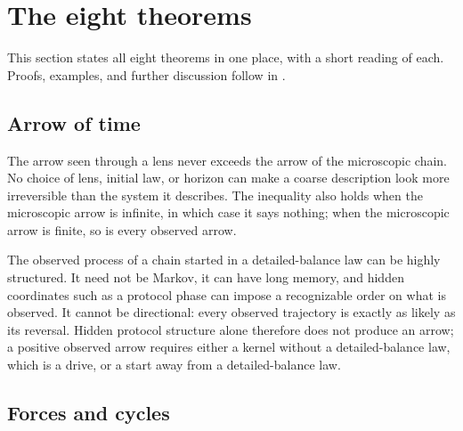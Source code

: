 \section{The eight theorems}\label{sec:main-results}

This section states all eight theorems in one place, with a short reading of each.
Proofs, examples, and further discussion follow in .

\subsection*{Arrow of time}

\begin{theorem}\label{thm:NG_ARROW_DPI}
\ThmStmtNGARROWDPI
\end{theorem}

The arrow seen through a lens never exceeds the arrow of the microscopic chain.
No choice of lens, initial law, or horizon can make a coarse description look more irreversible than the system it describes.
The inequality also holds when the microscopic arrow is infinite, in which case it says nothing; when the microscopic arrow is finite, so is every observed arrow.

\begin{theorem}\label{thm:NG_PROTOCOL_TRAP}
\ThmStmtNGPROTOCOLTRAP
\end{theorem}

The observed process of a chain started in a detailed-balance law can be highly structured.
It need not be Markov, it can have long memory, and hidden coordinates such as a protocol phase can impose a recognizable order on what is observed.
It cannot be directional: every observed trajectory is exactly as likely as its reversal.
Hidden protocol structure alone therefore does not produce an arrow; a positive observed arrow requires either a kernel without a detailed-balance law, which is a drive, or a start away from a detailed-balance law.

\subsection*{Forces and cycles}

\begin{theorem}\label{thm:NG_FORCE_FOREST}
\ThmStmtNGFORCEFOREST
\end{theorem}

